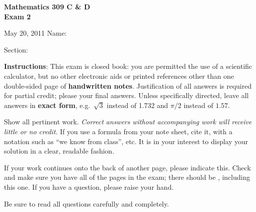 \documentclass[11pt]{exam}
\begin{document}
\addpoints 

\noindent 
\textbf{{\large Mathematics 309 C \& D \\ Exam 2}}

\noindent 
May 20, 2011  \hfill Name: \underline{\hspace{3in}} 

 \vspace*{2ex}

 \hfill Section: \underline{\hspace{1in}}


\vspace{0.15in}

\noindent 

\textbf{Instructions}: This exam is closed book: you are permitted the
use of a scientific calculator, but no other electronic aids or
printed references other than one double-sided page of
\textbf{handwritten notes}. Justification of all answers is required
for partial credit; please  your final answers. Unless specifically directed, leave all answers in \textbf{exact form}, e.g.\ $\sqrt{3}$ instead of 1.732 and $\pi/2$ instead of $1.57$.

Show all pertinent work. \emph{Correct answers without accompanying
  work will receive little or no credit.} If you use a formula from
your note sheet, cite it, with a notation such as ``we know from
class'', etc. It is in your interest to display your solution in a
clear, readable fashion. 

If your work continues onto the back of another page, please indicate
this. Check and make sure you have all of the pages in the
exam; there should be \numpages, including this one. If you have a
question, please raise your hand.

Be sure to read all questions carefully and completely.

\vspace*{2in}

\begin{center}
\gradetable
\end{center}
\end{document}

